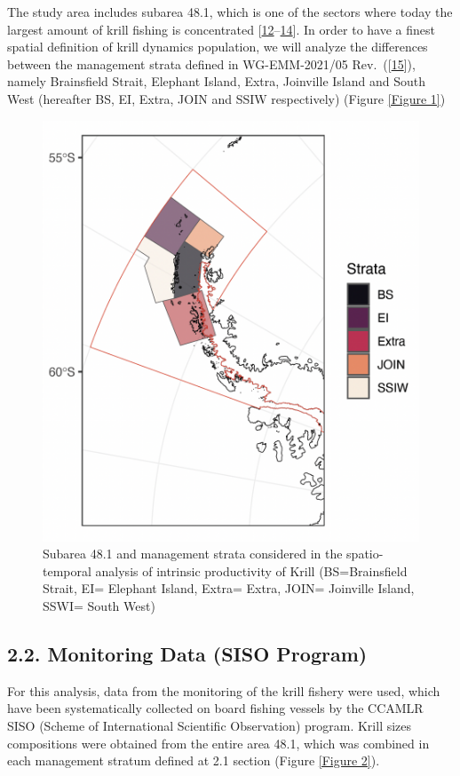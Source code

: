 \documentclass[
]{article}
\begin{document}
The study area includes subarea 48.1, which is one of the sectors where
today the largest amount of krill fishing is concentrated
{[}\protect\hyperlink{ref-McBride2021}{12}--\protect\hyperlink{ref-SantaCruz2022}{14}{]}.
In order to have a finest spatial definition of krill dynamics
population, we will analyze the differences between the management
strata defined in WG-EMM-2021/05
Rev.~({[}\protect\hyperlink{ref-Dornam2021}{15}{]}), namely Brainsfield
Strait, Elephant Island, Extra, Joinville Island and South West
(hereafter BS, EI, Extra, JOIN and SSIW respectively) (Figure
\ref{Figure 1})

\begin{figure}[H]

{\centering \includegraphics[width=0.6\linewidth]{Strata2} 

}

\caption{\label{Figure 1} Subarea 48.1 and management strata considered in the spatio-temporal analysis of intrinsic productivity of Krill (BS=Brainsfield Strait, EI= Elephant Island, Extra= Extra, JOIN= Joinville Island, SSWI= South West)}\label{fig:Figure 1}
\end{figure}

\hypertarget{monitoring-data-siso-program}{%
\subsection{2.2. Monitoring Data (SISO
Program)}\label{monitoring-data-siso-program}}

For this analysis, data from the monitoring of the krill fishery were
used, which have been systematically collected on board fishing vessels
by the CCAMLR SISO (Scheme of International Scientific Observation)
program. Krill sizes compositions were obtained from the entire area
48.1, which was combined in each management stratum defined at 2.1
section (Figure \ref{Figure 2}).
\end{document}
